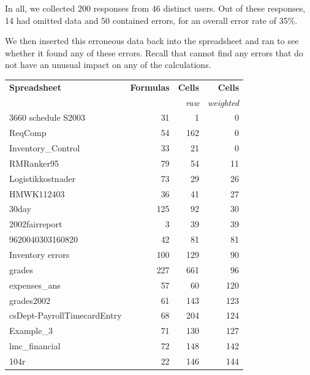 In all, we collected 200 responses from 46 distinct users. Out of
these responses, 14 had omitted data and 50 contained errors, for an
overall error rate of 35\%.

We then inserted this erroneous data back into the spreadsheet and
ran \checkcell{} to see whether it found any of these errors. Recall
that \checkcell{} cannot find any errors that do not have an unusual
impact on any of the calculations.


\begin{table}[t!]
  \centering
    \begin{tabular}{l|rrr}
      \bf{Spreadsheet} & \textsf{\bf{Formulas}}  & {\bf{Cells}}       & {\bf{Cells}} \\
                       &                         & {\small{\it{raw}}} & {\small{\it{weighted}}} \\
    \hline
\small{3660 schedule S2003} & \small{31} & \small{1} & \small{0} \\ 
\small{ReqComp} & \small{54} & \small{162} & \small{0} \\ 
\small{Inventory\_Control} & \small{33} & \small{21} & \small{0} \\ 
\small{RMRanker95} & \small{79} & \small{54} & \small{11} \\ 
\small{Logistikkostnader} & \small{73} & \small{29} & \small{26} \\ 
\small{HMWK112403} & \small{36} & \small{41} & \small{27} \\ 
\small{30day} & \small{125} & \small{92} & \small{30} \\ 
\small{2002fairreport} & \small{3} & \small{39} & \small{39} \\ 
\small{9620040303160820} & \small{42} & \small{81} & \small{81} \\ 
\small{Inventory errors} & \small{100} & \small{129} & \small{90} \\ 
\small{grades} & \small{227} & \small{661} & \small{96} \\ 
\small{expenses\_ans} & \small{57} & \small{60} & \small{120} \\ 
\small{grades2002} & \small{61} & \small{143} & \small{123} \\ 
\small{csDept-PayrollTimecardEntry} & \small{68} & \small{204} & \small{124} \\ 
\small{Example\_3} & \small{71} & \small{130} & \small{127} \\ 
\small{lmc\_financial} & \small{72} & \small{148} & \small{142} \\ 
\small{104r} & \small{22} & \small{146} & \small{144} \\ 

\end{tabular}
\end{table}
